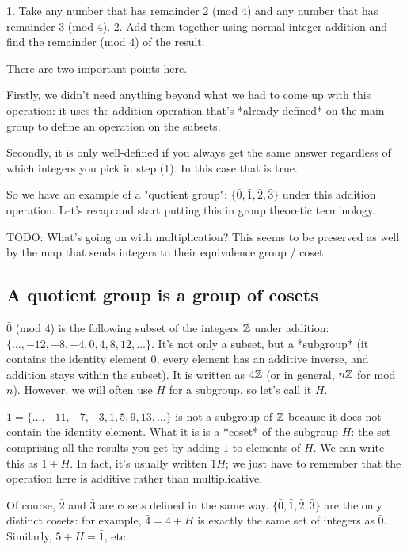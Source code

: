 1. Take any number that has remainder $2$ (mod $4$) and any number that has
   remainder $3$ (mod $4$).
2. Add them together using normal integer addition and find the remainder (mod
   $4$) of the result.

There are two important points here.

Firstly, we didn't need anything beyond what we had to come up with this
operation: it uses the addition operation that's *already defined* on the main
group to define an operation on the subsets.

Secondly, it is only well-defined if you always get the same answer regardless
of which integers you pick in step (1). In this case that is true.

So we have an example of a "quotient group": $\{\bar 0, \bar 1, \bar 2, \bar
3\}$ under this addition operation. Let's recap and start putting this in group
theoretic terminology.

TODO: What's going on with multiplication? This seems to be preserved as well
by the map that sends integers to their equivalence group / coset.

\subsection{A quotient group is a group of cosets}

$\bar 0$ (mod $4$) is the following subset of the integers $\mathbb{Z}$ under addition:
$\{\ldots, -12, -8, -4, 0, 4, 8, 12, \ldots\}$. It's not only a subset, but a
*subgroup* (it contains the identity element $0$, every element has an additive
inverse, and addition stays within the subset). It is written as $4\mathbb{Z}$ (or in
general, $n\mathbb{Z}$ for mod $n$). However, we will often use $H$ for a subgroup, so
let's call it $H$.

$\bar 1 = \{\ldots, -11, -7, -3, 1, 5, 9, 13, \ldots\}$ is not a subgroup of
$\mathbb{Z}$ because it does not contain the identity element. What it is is a *coset*
of the subgroup $H$: the set comprising all the results you get by adding $1$
to elements of $H$. We can write this as $1 + H$. In fact, it's usually written
$1H$; we just have to remember that the operation here is additive rather than
multiplicative.

Of course, $\bar 2$ and $\bar 3$ are cosets defined in the same way. $\{\bar 0,
\bar 1, \bar 2, \bar 3\}$ are the only distinct cosets: for example, $\bar 4 =
4+H$ is exactly the same set of integers as $\bar 0$. Similarly, $5 + H = \bar
1$, etc.

